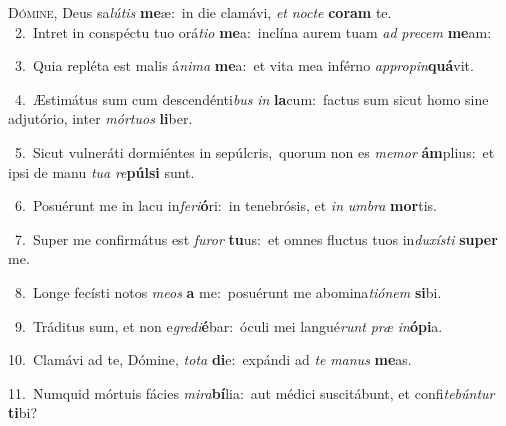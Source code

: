 \lettrine{\initial\textcolor{\initialcolor}{D}}{ómine,} Deus sa\-\textit{lú}\-\textit{tis} \textbf{me}\-æ:~\star in die clamávi, \textit{et} \textit{noc}\-\textit{te} \textbf{co}\-\textbf{ram} te.\\
{\numbfont\textcolor{\numbcolor}{~2.}}~Intret in conspéctu tuo orá\-\textit{ti}\-\textit{o} \textbf{me}\-a:~\star inclína aurem tuam \textit{ad} \textit{pre}\-\textit{cem} \textbf{me}\-am:\par
{\numbfont\textcolor{\numbcolor}{~3.}}~Quia repléta est malis á\-\textit{ni}\-\textit{ma} \textbf{me}\-a:~\star et vita mea inférno \textit{ap}\-\textit{pro}\textit{pin}\textbf{quá}vit.\par
{\numbfont\textcolor{\numbcolor}{~4.}}~Æstimátus sum cum descendénti\textit{bus} \textit{in} \textbf{la}\-cum:~\star factus sum sicut homo sine adjutório, inter \textit{mór}\-\textit{tu}\textit{os} \textbf{li}\-ber.\par
{\numbfont\textcolor{\numbcolor}{~5.}}~Sicut vulneráti dormiéntes in sepúlcris,~\dagger quorum non es \textit{me}\-\textit{mor} \textbf{ám}\-plius:~\star et ipsi de manu \textit{tu}\-\textit{a} \textit{re}\-\textbf{púl}\textbf{si} sunt.\par
{\numbfont\textcolor{\numbcolor}{~6.}}~Posuérunt me in lacu in\-\textit{fe}\-\textit{ri}\textbf{ó}ri:~\star in tenebrósis, et \textit{in} \textit{um}\-\textit{bra} \textbf{mor}\-tis.\par
{\numbfont\textcolor{\numbcolor}{~7.}}~Super me confirmátus est \textit{fu}\-\textit{ror} \textbf{tu}\-us:~\star et omnes fluctus tuos in\-\textit{du}\-\textit{xís}\textit{ti} \textbf{su}\-\textbf{per} me.\par
{\numbfont\textcolor{\numbcolor}{~8.}}~Longe fecísti notos \textit{me}\-\textit{os} \textbf{a} me:~\star posuérunt me abomina\-\textit{ti}\-\textit{ó}\textit{nem} \textbf{si}\-bi.\par
{\numbfont\textcolor{\numbcolor}{~9.}}~Tráditus sum, et non e\-\textit{gre}\-\textit{di}\textbf{é}bar:~\star óculi mei langué\textit{runt} \textit{præ} \textit{in}\-\textbf{ó}\textbf{pi}a.\par
{\numbfont\textcolor{\numbcolor}{10.}}~Clamávi ad te, Dómine, \textit{to}\-\textit{ta} \textbf{di}\-e:~\star expándi ad \textit{te} \textit{ma}\-\textit{nus} \textbf{me}\-as.\par
{\numbfont\textcolor{\numbcolor}{11.}}~Numquid mórtuis fácies \textit{mi}\-\textit{ra}\textbf{bí}lia:~\star aut médici suscitábunt, et confi\-\textit{te}\-\textit{bún}\textit{tur} \textbf{ti}\-bi?\par
